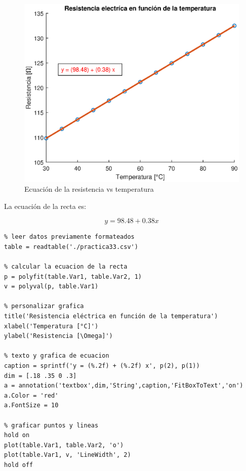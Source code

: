 \documentclass[letter,11pt]{article}
\begin{document}
\begin{figure}[!h]
\centering
\includegraphics[scale=1.00]{eps/3.3.2.eps}
\caption{Ecuación de la resistencia vs temperatura}
\label{practica33_2}
\end{figure}

La ecuación de la recta es:

\begin{equation}
    y = 98.48 + 0.38 x
\end{equation}

\footnotesize
\begin{verbatim}
% leer datos previamente formateados
table = readtable('./practica33.csv')

% calcular la ecuacion de la recta
p = polyfit(table.Var1, table.Var2, 1)
v = polyval(p, table.Var1)

% personalizar grafica
title('Resistencia eléctrica en función de la temperatura')
xlabel('Temperatura [°C]')
ylabel('Resistencia [\Omega]')

% texto y grafica de ecuacion
caption = sprintf('y = (%.2f) + (%.2f) x', p(2), p(1))
dim = [.18 .35 0 .3]
a = annotation('textbox',dim,'String',caption,'FitBoxToText','on')
a.Color = 'red'
a.FontSize = 10

% graficar puntos y lineas
hold on
plot(table.Var1, table.Var2, 'o')
plot(table.Var1, v, 'LineWidth', 2)
hold off
\end{verbatim}
\normalsize
\end{document}
